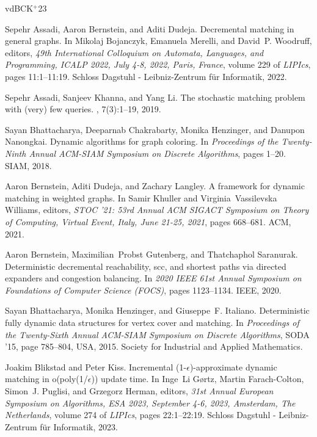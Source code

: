 \documentclass[a4paper,11pt]{article}
\theoremstyle{definition}
\theoremstyle{definition}
\theoremstyle{definition}
\theoremstyle{definition}
\theoremstyle{definition}
\theoremstyle{definition}
\theoremstyle{definition}
\theoremstyle{definition}
\theoremstyle{definition}
\theoremstyle{definition}
\theoremstyle{definition}
\theoremstyle{definition}
\theoremstyle{definition}
\theoremstyle{definition}
\theoremstyle{definition}
\begin{document}
\newpage

\newcommand{\etalchar}[1]{$^{#1}$}
\begin{thebibliography}{vdBCK{\etalchar{+}}23}

Sepehr Assadi, Aaron Bernstein, and Aditi Dudeja.
\newblock Decremental matching in general graphs.
\newblock In Mikolaj Bojanczyk, Emanuela Merelli, and David~P. Woodruff,
  editors, {\em 49th International Colloquium on Automata, Languages, and
  Programming, {ICALP} 2022, July 4-8, 2022, Paris, France}, volume 229 of {\em
  LIPIcs}, pages 11:1--11:19. Schloss Dagstuhl - Leibniz-Zentrum f{\"{u}}r
  Informatik, 2022.

Sepehr Assadi, Sanjeev Khanna, and Yang Li.
\newblock The stochastic matching problem with (very) few queries.
,
  7(3):1--19, 2019.

Sayan Bhattacharya, Deeparnab Chakrabarty, Monika Henzinger, and Danupon
  Nanongkai.
\newblock Dynamic algorithms for graph coloring.
\newblock In {\em Proceedings of the Twenty-Ninth Annual ACM-SIAM Symposium on
  Discrete Algorithms}, pages 1--20. SIAM, 2018.

Aaron Bernstein, Aditi Dudeja, and Zachary Langley.
\newblock A framework for dynamic matching in weighted graphs.
\newblock In Samir Khuller and Virginia~Vassilevska Williams, editors, {\em
  {STOC} '21: 53rd Annual {ACM} {SIGACT} Symposium on Theory of Computing,
  Virtual Event, Italy, June 21-25, 2021}, pages 668--681. {ACM}, 2021.

Aaron Bernstein, Maximilian~Probst Gutenberg, and Thatchaphol Saranurak.
\newblock Deterministic decremental reachability, scc, and shortest paths via
  directed expanders and congestion balancing.
\newblock In {\em 2020 IEEE 61st Annual Symposium on Foundations of Computer
  Science (FOCS)}, pages 1123--1134. IEEE, 2020.

Sayan Bhattacharya, Monika Henzinger, and Giuseppe~F. Italiano.
\newblock Deterministic fully dynamic data structures for vertex cover and
  matching.
\newblock In {\em Proceedings of the Twenty-Sixth Annual ACM-SIAM Symposium on
  Discrete Algorithms}, SODA '15, page 785–804, USA, 2015. Society for
  Industrial and Applied Mathematics.

Joakim Blikstad and Peter Kiss.
\newblock Incremental (1-{\(\epsilon\)})-approximate dynamic matching in
  o(poly(1/{\(\epsilon\)})) update time.
\newblock In Inge~Li G{\o}rtz, Martin Farach{-}Colton, Simon~J. Puglisi, and
  Grzegorz Herman, editors, {\em 31st Annual European Symposium on Algorithms,
  {ESA} 2023, September 4-6, 2023, Amsterdam, The Netherlands}, volume 274 of
  {\em LIPIcs}, pages 22:1--22:19. Schloss Dagstuhl - Leibniz-Zentrum f{\"{u}}r
  Informatik, 2023.


\end{thebibliography}
\end{document}
